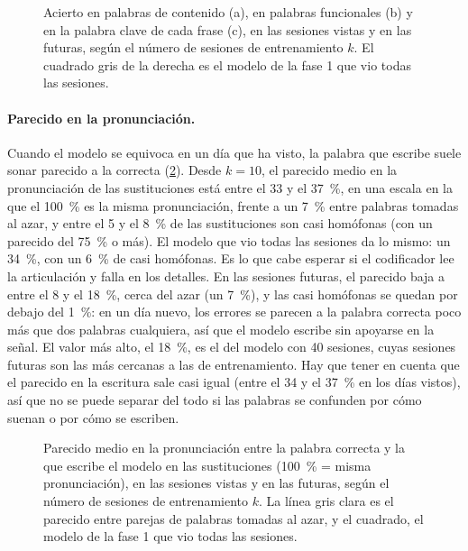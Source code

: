 \begin{figure}[htbp]
  \centering
  \caption[Acierto en palabras de contenido (a), en palabras funcionales (b) y en la palabra clave de cada frase (c), en las sesiones vistas y en las futuras, según el número de sesiones de entrenamiento $k$]{Acierto en palabras de contenido (a), en palabras funcionales (b) y en la palabra clave de cada frase (c), en las sesiones vistas y en las futuras, según el número de sesiones de entrenamiento $k$. El cuadrado gris de la derecha es el modelo de la fase 1 que vio todas las sesiones.}
  \label{fig:res-evolucion}
\end{figure}

\paragraph{Parecido en la pronunciación.} Cuando el modelo se equivoca en un día que ha visto, la palabra que escribe suele sonar parecido a la correcta (\cref{fig:res-pronunciacion}). Desde $k = 10$, el parecido medio en la pronunciación de las sustituciones está entre el 33 y el 37~\%, en una escala en la que el 100~\% es la misma pronunciación, frente a un 7~\% entre palabras tomadas al azar, y entre el 5 y el 8~\% de las sustituciones son casi homófonas (con un parecido del 75~\% o más). El modelo que vio todas las sesiones da lo mismo: un 34~\%, con un 6~\% de casi homófonas. Es lo que cabe esperar si el codificador lee la articulación y falla en los detalles. En las sesiones futuras, el parecido baja a entre el 8 y el 18~\%, cerca del azar (un 7~\%), y las casi homófonas se quedan por debajo del 1~\%: en un día nuevo, los errores se parecen a la palabra correcta poco más que dos palabras cualquiera, así que el modelo escribe sin apoyarse en la señal. El valor más alto, el 18~\%, es el del modelo con 40 sesiones, cuyas sesiones futuras son las más cercanas a las de entrenamiento. Hay que tener en cuenta que el parecido en la escritura sale casi igual (entre el 34 y el 37~\% en los días vistos), así que no se puede separar del todo si las palabras se confunden por cómo suenan o por cómo se escriben.

\begin{figure}[htbp]
  \centering
  \caption[Parecido medio en la pronunciación entre la palabra correcta y la que escribe el modelo en las sustituciones (100~\% = misma pronunciación), en las sesiones vistas y en las futuras, según el número de sesiones de entrenamiento $k$]{Parecido medio en la pronunciación entre la palabra correcta y la que escribe el modelo en las sustituciones (100~\% = misma pronunciación), en las sesiones vistas y en las futuras, según el número de sesiones de entrenamiento $k$. La línea gris clara es el parecido entre parejas de palabras tomadas al azar, y el cuadrado, el modelo de la fase 1 que vio todas las sesiones.}
  \label{fig:res-pronunciacion}
\end{figure}

